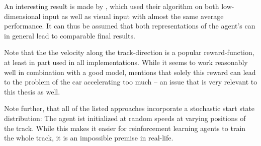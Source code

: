 An interesting result is made by \citet{lillicrap_continuous_2015}, which used their algorithm on both low-dimensional input as well as visual input with almost the same average performance. It can thus be assumed that both representations of the agent's  can in general lead to comparable final results.

Note that the the velocity along the track-direction is a popular reward-function, at least in part used in all implementations. While it seems to work reasonably well in combination with a good model, \cite{ben_lau_using_2016} mentions that solely this reward can lead to the problem of the car accelerating too much -- an issue that is very relevant to this thesis as well.

Note further, that all of the listed approaches incorporate a stochastic start state distribution: The agent ist initialized at random speeds at varying positions of the track. While this makes it easier for reinforcement learning agents to train the whole track, it is an impossible premise in real-life.